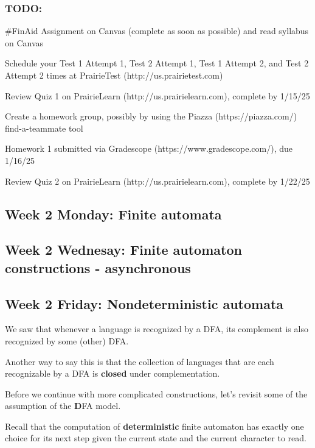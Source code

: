 \subsubsection*{TODO:}
\begin{list}{\itemsep-10pt}
   \item \#FinAid Assignment on Canvas (complete as soon as possible) and read syllabus on Canvas
   \item Schedule your Test 1 Attempt 1, Test 2 Attempt 1, Test 1 Attempt 2, and Test 2 Attempt 2 times 
   at PrairieTest (http://us.prairietest.com)
   \item Review Quiz 1 on PrairieLearn (http://us.prairielearn.com), complete by 1/15/25
   \item Create a homework group, possibly by using the Piazza (https://piazza.com/) find-a-teammate tool
   \item Homework 1 submitted via Gradescope (https://www.gradescope.com/), due 1/16/25
   \item Review Quiz 2 on PrairieLearn (http://us.prairielearn.com), complete by 1/22/25
\end{list}


\newpage

\subsection*{Week 2 Monday: Finite automata}




\subsection*{Week 2 Wednesay: Finite automaton constructions - asynchronous}



\newpage
\subsection*{Week 2 Friday: Nondeterministic automata}

We saw that whenever a language is recognized by a DFA, its
complement is also recognized by some (other) DFA. 

Another way to say this is that the collection of languages
that are each recognizable by a DFA is {\bf closed} under complementation.


Before we continue with more complicated constructions, let's revisit some of 
the assumption of the {\bf D}FA model.

Recall that the computation of {\bf deterministic} finite automaton has exactly one choice for its next step given the current state and the current character to read.






